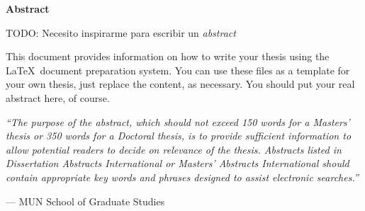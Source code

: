 \begin{center}
\textbf{\large Abstract}
\end{center}

TODO: Necesito inspirarme para escribir un \emph{abstract}

This document provides information on how to write your thesis using
the \LaTeX\ document preparation system.  You can use these files as a
template for your own thesis, just replace the content, as necessary.
You should put your real abstract here, of course.

\vspace{1cm}

\emph{``The purpose of the abstract, which should not exceed 150 words for
a Masters' thesis or 350 words for a Doctoral thesis, is to provide
sufficient information to allow potential readers to decide on relevance
of the thesis. Abstracts listed in Dissertation Abstracts International
or Masters' Abstracts International should contain appropriate key
words and phrases designed to assist electronic searches.''}

\hfill --- MUN School of Graduate Studies
